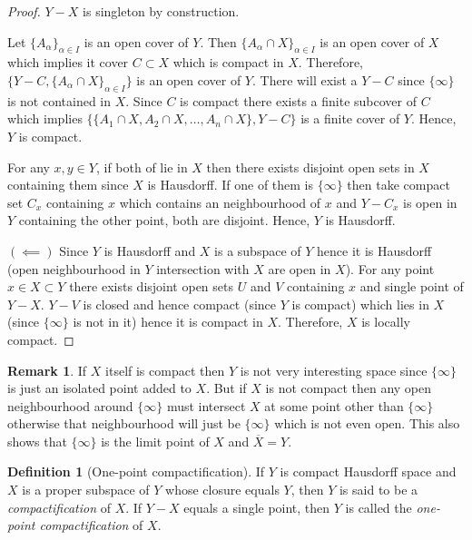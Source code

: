 \documentclass[12pt,reqno]{amsart}
\theoremstyle{plain}
\theoremstyle{definition}
\newtheorem{defn}{Definition}
\newtheorem{rem}{Remark}
\begin{document}
\begin{proof}
    \noindent $Y - X$ is singleton by construction.

     Let $\{A_\alpha\}_{\alpha \in I}$ is an open cover of $Y$. Then $\{A_\alpha \cap X\}_{\alpha\in I}$ is an open cover of $X$ which implies it cover $C \subset X$ which is compact in $X$. Therefore, $\{Y - C, \{A_\alpha \cap X\}_{\alpha \in I}\}$ is an open cover of $Y$. There will exist a $Y - C$ since $\{\infty\}$ is not contained in $X$. Since $C$ is compact there exists a finite subcover of $C$ which implies $\{\{A_1 \cap X, A_2 \cap X, \dots, A_n \cap X\}, Y - C\}$ is a finite cover of $Y$. Hence, $Y$ is compact.

    \noindent For any $x,y \in Y$, if both of lie in $X$ then there exists disjoint open sets in $X$ containing them since $X$ is Hausdorff. If one of them is $\{\infty\}$ then take compact set $C_x$ containing $x$ which contains an neighbourhood of $x$ and $Y - C_x$ is open in $Y$ containing the other point, both are disjoint. Hence, $Y$ is Hausdorff.

    \noindent $(\impliedby)$ Since $Y$ is Hausdorff and $X$ is a subspace of $Y$ hence it is Hausdorff (open neighbourhood in $Y$ intersection with $X$ are open in $X$). For any point $x \in X \subset Y$ there exists disjoint open sets $U$ and $V$ containing $x$ and single point of $Y - X$. $Y - V$ is closed and hence compact (since $Y$ is compact) which lies in $X$ (since $\{\infty\}$ is not in it) hence it is compact in $X$. Therefore, $X$ is locally compact.
\end{proof}

\begin{rem}
    If $X$ itself is compact then $Y$ is not very interesting space since $\{\infty\}$ is just an isolated point added to $X$. But if $X$ is not compact then any open neighbourhood around $\{\infty\}$ must intersect $X$ at some point other than $\{\infty\}$ otherwise that neighbourhood will just be $\{\infty\}$ which is not even open. This also shows that $\{\infty\}$ is the limit point of $X$ and $\overline{X} = Y$.
\end{rem}

\begin{defn}[One-point compactification]
    If $Y$ is compact Hausdorff space and $X$ is a proper subspace of $Y$ whose closure equals $Y$, then $Y$ is said to be a {\it compactification} of $X$. If $Y-X$ equals a single point, then $Y$ is called the {\it one-point compactification} of $X$.
\end{defn}
\end{document}
